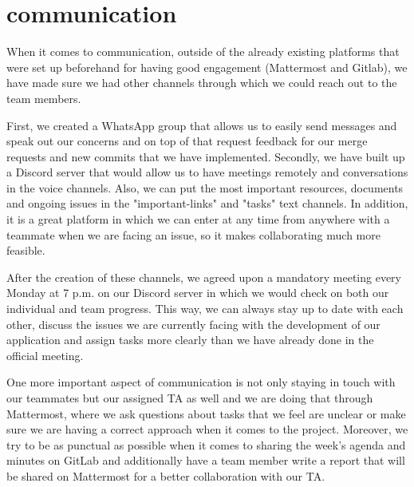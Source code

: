 \section{communication}
When it comes to communication, outside of the already existing platforms that were set up beforehand for having good engagement (Mattermost and Gitlab), we have made sure we had other channels through which we could reach out to the team members.\par
\smallskip
First, we created a WhatsApp group that allows us to easily send messages and speak out our concerns and on top of that request feedback for our merge requests and new commits that we have implemented. Secondly, we have built up a Discord server that would allow us to have meetings remotely and conversations in the voice channels. Also, we can put the most important resources, documents and ongoing issues in the "important-links" and "tasks" text channels. In addition, it is a great platform in which we can enter at any time from anywhere with a teammate when we are facing an issue, so it makes collaborating much more feasible. \par
\smallskip
After the creation of these channels, we agreed upon a mandatory meeting every Monday at 7 p.m. on our Discord server in which we would check on both our individual and team progress. This way, we can always stay up to date with each other, discuss the issues we are currently facing with the development of our application and assign tasks more clearly than we have already done in the official meeting. \par
\smallskip
One more important aspect of communication is not only staying in touch with our teammates but our assigned TA as well and we are doing that through Mattermost, where we ask questions about tasks that we feel are unclear or make sure we are having a correct approach when it comes to the project. Moreover, we try to be as punctual as possible when it comes to sharing the week's agenda and minutes on GitLab and additionally have a team member write a report that will be shared on Mattermost for a better collaboration with our TA.\par




